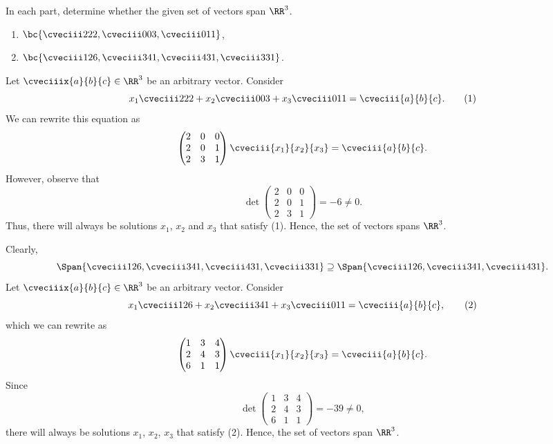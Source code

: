 \begin{problem}
    In each part, determine whether the given set of vectors span $\RR^3$.

    \begin{enumerate}
        \item $\bc{\cveciii222, \cveciii003, \cveciii011}$,
        \item $\bc{\cveciii126, \cveciii341, \cveciii431, \cveciii331}$.
    \end{enumerate}
\end{problem}
\begin{solution}
    \begin{ppart}
        Let $\cveciiix{a}{b}{c} \in \RR^3$ be an arbitrary vector. Consider \[x_1 \cveciii222 + x_2 \cveciii003 + x_3 \cveciii011 = \cveciii{a}{b}{c}. \tag{1}\] We can rewrite this equation as \[\begin{pmatrix}2 & 0 & 0 \\ 2 & 0 & 1 \\ 2 & 3 & 1\end{pmatrix} \cveciii{x_1}{x_2}{x_3} = \cveciii{a}{b}{c}.\] However, observe that \[\det \begin{pmatrix}2 & 0 & 0 \\ 2 & 0 & 1 \\ 2 & 3 & 1\end{pmatrix} = -6 \neq 0.\] Thus, there will always be solutions $x_1$, $x_2$ and $x_3$ that satisfy (1). Hence, the set of vectors spans $\RR^3$.
    \end{ppart}
    \begin{ppart}
        Clearly, \[\Span{\cveciii126, \cveciii341, \cveciii431, \cveciii331} \supseteq \Span{\cveciii126, \cveciii341, \cveciii431}.\] Let $\cveciiix{a}{b}{c} \in \RR^3$ be an arbitrary vector. Consider \[x_1 \cveciii126 + x_2 \cveciii341 + x_3 \cveciii011 = \cveciii{a}{b}{c}, \tag{2}\] which we can rewrite as \[\begin{pmatrix}1 & 3 & 4 \\ 2 & 4 & 3 \\ 6 & 1 & 1\end{pmatrix} \cveciii{x_1}{x_2}{x_3} = \cveciii{a}{b}{c}.\] Since \[\det \begin{pmatrix}1 & 3 & 4 \\ 2 & 4 & 3 \\ 6 & 1 & 1\end{pmatrix} = -39 \neq 0,\] there will always be solutions $x_1$, $x_2$, $x_3$ that satisfy (2). Hence, the set of vectors span $\RR^3$.
    \end{ppart}
\end{solution}

